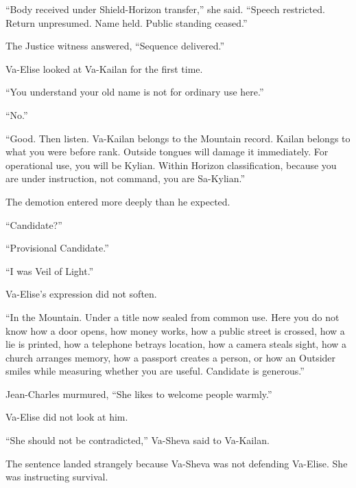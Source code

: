 “Body received under Shield-Horizon transfer,” she said. “Speech restricted. Return unpresumed. Name held. Public standing ceased.”\par

The Justice witness answered, “Sequence delivered.”\par

Va-Elise looked at Va-Kailan for the first time.\par

“You understand your old name is not for ordinary use here.”\par

“No.”\par

“Good. Then listen. Va-Kailan belongs to the Mountain record. Kailan belongs to what you were before rank. Outside tongues will damage it immediately. For operational use, you will be Kylian. Within Horizon classification, because you are under instruction, not command, you are Sa-Kylian.”\par

The demotion entered more deeply than he expected.\par

“Candidate?”\par

“Provisional Candidate.”\par

“I was Veil of Light.”\par

Va-Elise’s expression did not soften.\par

“In the Mountain. Under a title now sealed from common use. Here you do not know how a door opens, how money works, how a public street is crossed, how a lie is printed, how a telephone betrays location, how a camera steals sight, how a church arranges memory, how a passport creates a person, or how an Outsider smiles while measuring whether you are useful. Candidate is generous.”\par

Jean-Charles murmured, “She likes to welcome people warmly.”\par

Va-Elise did not look at him.\par

“She should not be contradicted,” Va-Sheva said to Va-Kailan.\par

The sentence landed strangely because Va-Sheva was not defending Va-Elise. She was instructing survival.\par

